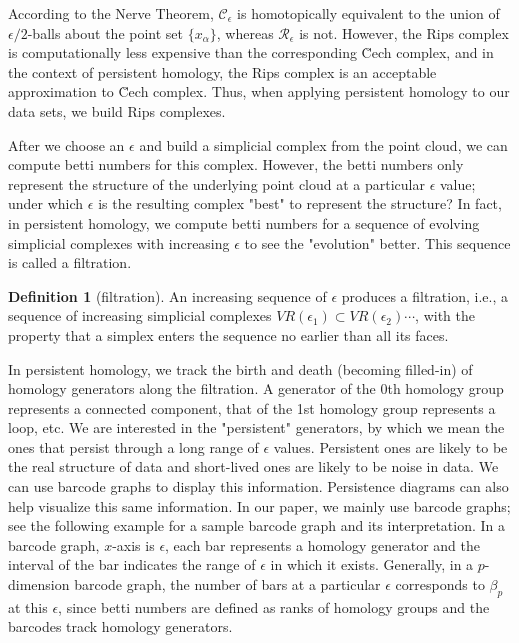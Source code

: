 \documentclass[12pt]{article}
\theoremstyle{definition}
\newtheorem{definition}{Definition}
\begin{document}
According to the Nerve Theorem, $\mathcal{C}_\epsilon$ is homotopically equivalent to the union of $\epsilon/2$-balls about the point set $\{x_\alpha\}$, whereas $\mathcal{R}_\epsilon$ is not. However, the Rips complex is computationally less expensive than the corresponding \u Cech complex, and in the context of persistent homology, the Rips complex is an acceptable approximation to \u Cech complex\cite{ghrist2007barcodes}. Thus, when applying persistent homology to our data sets, we build Rips complexes. 
\newline
\par After we choose an $\epsilon$ and build a simplicial complex from the point cloud, we can compute betti numbers for this complex. However, the betti numbers only represent the structure of the underlying point cloud at a particular $\epsilon$ value; under which $\epsilon$ is the resulting complex "best" to represent the structure? In fact, in persistent homology, we compute betti numbers for a sequence of evolving simplicial complexes with increasing $\epsilon$ to see the "evolution" better. This sequence is called a filtration.
\begin{definition}[filtration]
An increasing sequence of $\epsilon$ produces a filtration, i.e., a sequence of increasing simplicial complexes $VR(\epsilon_1)\subset VR(\epsilon_2) \cdots$, with the property that a simplex enters the sequence no earlier than all its faces.\cite{zhu2013language}
\end{definition}
In persistent homology, we track the birth and death (becoming filled-in) of homology generators along the filtration. A generator of the 0th homology group represents a connected component, that of the 1st homology group represents a loop, etc. We are interested in the "persistent" generators, by which we mean the ones that persist through a long range of $\epsilon$ values. Persistent ones are likely to be the real structure of data and short-lived ones are likely to be noise in data. We can use barcode graphs\cite{ghrist2007barcodes} to display this information. Persistence diagrams\cite{Edelsbrunner2002persistentdiagram} can also help visualize this same information. In our paper, we mainly use barcode graphs; see the following example for a sample barcode graph and its interpretation. In a barcode graph, $x$-axis is $\epsilon$, each bar represents a homology generator and the interval of the bar indicates the range of $\epsilon$ in which it exists. Generally, in a $p$-dimension barcode graph, the number of bars at a particular $\epsilon$ corresponds to $\beta_p$ at this $\epsilon$, since betti numbers are defined as ranks of homology groups and the barcodes track homology generators.
\end{document}

